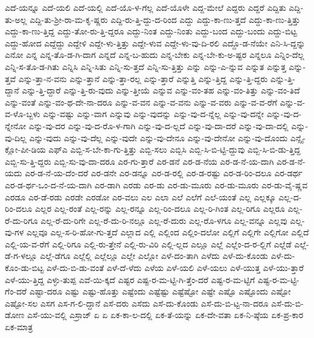 {ಎದೆ-ಯನ್ನೂ
ಎದೆ-ಯಲಿ
ಎದೆ-ಯಲ್ಲಿ
ಎದೆ-ಯೊ-ಳ-ಗೆಲ್ಲ
ಎದೆ-ಯೊಳೇ
ಎದ್ದ-ಮೇಲೆ
ಎದ್ದರು
ಎದ್ದರೆ
ಎದ್ದಿತು
ಎದ್ದಿ-ತು-ಅಲ್ಲ
ಎದ್ದಿ-ತು-ಶ್ರೀ-ರಾ-ಮ-ಕೃ-ಷ್ಣರು
ಎದ್ದಿ-ರು-ತ್ತಿ-ದ್ದು-ದ-ರಿಂದ
ಎದ್ದು
ಎದ್ದು-ಕಾ-ಣು-ತ್ತದೆ
ಎದ್ದು-ಕಾ-ಣು-ತ್ತಿತ್ತು
ಎದ್ದು-ಕಾ-ಣು-ತ್ತಿದ್ದ
ಎದ್ದು-ತೋ-ರು-ತ್ತಿ-ದ್ದರೂ
ಎದ್ದು-ನಿಂತ
ಎದ್ದು-ನಿಂತು
ಎದ್ದು-ಬಂದ
ಎದ್ದು-ಬಂದು
ಎದ್ದು-ಬಿಟ್ಟ
ಎದ್ದು-ಹೋದ
ಎದ್ದೆದ್ದು
ಎದ್ದೇಳಿ
ಎದ್ದೇ-ಳು-ತ್ತಿತ್ತು
ಎದ್ದೇ-ಳುವ
ಎದ್ದೇ-ಳು-ವು-ದಿ-ರಲಿ
ಎದ್ದೊ-ಡ-ನೆಯೇ
ಎನಿ-ಸಿ-ದ್ದನ್ನು
ಎನೋ
ಎನ್ನ
ಎನ್ನ-ತೊ-ಡ-ಗಿ-ದಾಗ
ಎನ್ನದೆ
ಎನ್ನ-ಬ-ಹುದು
ಎನ್ನ-ಬೇಕು
ಎನ್ನ-ಬೇ-ಕು-ಅ-ಷ್ಟರ
ಎನ್ನಲೂ
ಎನ್ನಿಂ-ದೆಲ್ಲ
ಎನ್ನಿ-ಸ-ತೊ-ಡ-ಗಿತು
ಎನ್ನಿಸಿ
ಎನ್ನಿ-ಸಿತು
ಎನ್ನಿ-ಸು-ತ್ತದೆ
ಎನ್ನಿ-ಸು-ತ್ತಿತ್ತು
ಎನ್ನು
ಎನ್ನು-ಎ-ನ್ನುವ
ಎನ್ನುತ
ಎನ್ನುತ್ತ
ಎನ್ನು-ತ್ತವೆ
ಎನ್ನು-ತ್ತಾ-ನ-ವನು
ಎನ್ನು-ತ್ತಾನೆ
ಎನ್ನು-ತ್ತಾ-ರಲ್ಲ
ಎನ್ನು-ತ್ತಾರೆ
ಎನ್ನುತ್ತಿ
ಎನ್ನು-ತ್ತಿದ್ದ
ಎನ್ನು-ತ್ತಿ-ದ್ದರು
ಎನ್ನು-ತ್ತಿ-ದ್ದಾನೆ
ಎನ್ನು-ತ್ತಿ-ದ್ದಾರೆ
ಎನ್ನು-ತ್ತಿ-ರು-ವುದು
ಎನ್ನು-ತ್ತೀಯೆ
ಎನ್ನುವ
ಎನ್ನು-ವಂ-ತಹ
ಎನ್ನು-ವಂ-ತಿತ್ತು
ಎನ್ನು-ವಂ-ತಿದೆ
ಎನ್ನು-ವಂತೆ
ಎನ್ನು-ವಂ-ಥ-ದೇ-ನಾ-ದರೂ
ಎನ್ನು-ವ-ವನ
ಎನ್ನು-ವ-ವನು
ಎನ್ನು-ವ-ವರು
ಎನ್ನು-ವ-ವ-ರೆಗೆ
ಎನ್ನು-ವ-ವ-ಳೊ-ಬ್ಬಳು
ಎನ್ನು-ವಷ್ಟು
ಎನ್ನು-ವಾಗ
ಎನ್ನುವು
ಎನ್ನು-ವುದನ್ನು
ಎನ್ನು-ವು-ದ-ನ್ನೆಲ್ಲ
ಎನ್ನು-ವು-ದನ್ನೇ
ಎನ್ನು-ವು-ದ-ನ್ನೇನೋ
ಎನ್ನು-ವು-ದರ
ಎನ್ನು-ವು-ದ-ರೊ-ಳ-ಗಾಗಿ
ಎನ್ನು-ವು-ದ-ಲ್ಲದೆ
ಎನ್ನು-ವು-ದಾ-ದರೆ
ಎನ್ನು-ವು-ದಾ-ದಲ್ಲಿ
ಎನ್ನು-ವು-ದಿಲ್ಲ
ಎನ್ನು-ವುದು
ಎನ್ನು-ವು-ದೆಲ್ಲ
ಎನ್ನು-ವುದೇ
ಎನ್ನು-ವು-ದೇನೂ
ಎನ್ನು-ವು-ದೇನೋ
ಎನ್ನು-ವು-ದೊಂದು
ಎನ್ಸೈ-ಕ್ಲೋ-ಪೀ-ಡಿಯ
ಎಫ್ಎ
ಎಬ್ಬಿ-ಸ-ಬೇ-ಕಾ-ಗು-ತ್ತಿತ್ತು
ಎಬ್ಬಿ-ಸಲು
ಎಬ್ಬಿಸಿ
ಎಬ್ಬಿ-ಸಿ-ಬಿ-ಟ್ಟಿ-ದ್ದುವು
ಎಬ್ಬಿ-ಸಿ-ಬಿ-ಡು-ತ್ತಿದ್ದ
ಎಬ್ಬಿ-ಸು-ತ್ತಿ-ದ್ದರು
ಎಬ್ಬಿ-ಸು-ವು-ದಾ-ದರೂ
ಎರ-ಗು-ತ್ತಾರೆ
ಎರ-ಡನೆ
ಎರ-ಡ-ನೆಯ
ಎರ-ಡ-ನೆ-ಯ-ದಾಗಿ
ಎರ-ಡ-ನೆ-ಯದು
ಎರ-ಡ-ನೆ-ಯ-ದೆಂ-ದರೆ
ಎರ-ಡನೇ
ಎರ-ಡನ್ನೂ
ಎರ-ಡ-ರಲ್ಲಿ
ಎರ-ಡ-ರಷ್ಟು
ಎರ-ಡ-ರಿಂ-ದಲೂ
ಎರ-ಡರ್ಥ
ಎರ-ಡ-ರ್ಥ-ಒಂ-ದ-ನೆ-ಯ-ದಾಗಿ
ಎರ-ಡಾಗಿ
ಎರಡು
ಎರ-ಡು
ಎರ-ಡು-ಮೂರು
ಎರ-ಡು-ಮೂರು
ಎರ-ಡು-ವೈ-ಷ್ಣವ
ಎರಡೂ
ಎರ-ಡೆ-ರಡು
ಎರಡೇ
ಎರಡೋ
ಎರ-ವಲು
ಎಲ
ಎಲಾ
ಎಲೆ
ಎಲೆಗೆ
ಎಲೆ-ಯಂತೆ
ಎಲ್ಲ
ಎಲ್ಲಕ್ಕೂ
ಎಲ್ಲ-ದ-ರಿಂ-ದಲೂ
ಎಲ್ಲರ
ಎಲ್ಲ-ರಂತೆ
ಎಲ್ಲ-ರನ್ನು
ಎಲ್ಲ-ರನ್ನೂ
ಎಲ್ಲ-ರಿಂ-ದಲೂ
ಎಲ್ಲ-ರಿ-ಗಿಂತ
ಎಲ್ಲ-ರಿಗೂ
ಎಲ್ಲರೂ
ಎಲ್ಲ-ರೆ-ದು-ರಿಗೂ
ಎಲ್ಲ-ರೆ-ದು-ರಿಗೇ
ಎಲ್ಲ-ರೆ-ದು-ರಿ-ನಲ್ಲೂ
ಎಲ್ಲ-ರೆ-ದುರು
ಎಲ್ಲ-ರೊ-ಳಗೂ
ಎಲ್ಲ-ವನ್ನೂ
ಎಲ್ಲವು
ಎಲ್ಲ-ವು-ಗಳ
ಎಲ್ಲವೂ
ಎಲ್ಲ-ಸ-ರಿ-ಹೋ-ಗು-ತ್ತದೆ
ಎಲ್ಲಾದ
ಎಲ್ಲಿ
ಎಲ್ಲಿಂದ
ಎಲ್ಲಿಂ-ದಲೋ
ಎಲ್ಲಿಗೆ
ಎಲ್ಲಿಗೇ
ಎಲ್ಲಿಗೋ
ಎಲ್ಲಿದೆ
ಎಲ್ಲಿ-ಯ-ವ-ರೆಗೆ
ಎಲ್ಲಿ-ರಿಗೂ
ಎಲ್ಲಿ-ರು-ತ್ತೇನೆ
ಎಲ್ಲಿ-ರು-ವಿರಿ
ಎಲ್ಲಿ-ಲ್ಲದ
ಎಲ್ಲೂ
ಎಲ್ಲೆ
ಎಲ್ಲೆಂ-ದ-ರ-ಲ್ಲಿಗೆ
ಎಲ್ಲೆಡೆ
ಎಲ್ಲೆ-ಡೆ-ಗ-ಳಲ್ಲೂ
ಎಲ್ಲೆ-ಡೆಗೂ
ಎಲ್ಲೆಲ್ಲಿ
ಎಲ್ಲೆಲ್ಲೂ
ಎಲ್ಲೇ
ಎಲ್ಲೋ
ಎಳೆ-ದಂ-ತಾಗಿ
ಎಳೆದು
ಎಳೆ-ದು-ಕೊಂಡು
ಎಳೆ-ದು-ಕೊಂ-ಡು-ಬಿಟ್ಟ
ಎಳೆ-ದು-ಬಿ-ಡು-ವಂತೆ
ಎಳೆ-ದೆ-ಳೆದು
ಎಳೆಯ
ಎಳೆ-ಯಲಿ
ಎಳೆ-ಯಲು
ಎಳೆ-ಯುತ್ತ
ಎಳೆ-ಯು-ತ್ತಾರೆ
ಎಳೆ-ಯು-ತ್ತಿದ್ದ
ಎಳ್ಳು-ತುಪ್ಪ
ಎವೆ-ಯಿ-ಕ್ಕದೆ
ಎಷ್ಟರ
ಎಷ್ಟ-ರ-ಮ-ಟ್ಟಿ-ಗಿ-ತ್ತೆಂ-ದರೆ
ಎಷ್ಟ-ರ-ಮ-ಟ್ಟಿಗೆ
ಎಷ್ಟ-ರ-ಮ-ಟ್ಟಿ-ಗೆಂ-ದರೆ
ಎಷ್ಟಾ-ದರೂ
ಎಷ್ಟು
ಎಷ್ಟು-ಹೊತ್ತು
ಎಷ್ಟೆಂದು
ಎಷ್ಟೆಷ್ಟು
ಎಷ್ಟೆಷ್ಟೋ
ಎಷ್ಟೇ
ಎಷ್ಟೊ
ಎಷ್ಟೊಂದು
ಎಷ್ಟೋ
ಎಷ್ಟೋ-ಸಲ
ಎಸಗ
ಎಸ-ಗ-ಲಿ-ದ್ದಾನೆ
ಎಸೆ-ದರು
ಎಸೆದು
ಎಸೆ-ದು-ಕೊಂಡು
ಎಸೆ-ದು-ಬಿ-ಟ್ಟ-ನಾ-ದರೂ
ಎಸೆ-ದು-ಬಿ-ಡೋಣ
ಎಸೆ-ಯು-ವಲ್ಲಿ
ಎಸ್ರಾಜ್
ಏ
ಏ
ಏಕ-ಕಾ-ಲ-ದಲ್ಲಿ
ಏಕ-ತೆ-ಯನ್ನು
ಏಕ-ದೇ-ವತಾ
ಏಕ-ನಿ-ಷ್ಠೆಯ
ಏಕ-ಪ್ರ-ಕಾರ
ಏಕ-ಮಾತ್ರ
}
